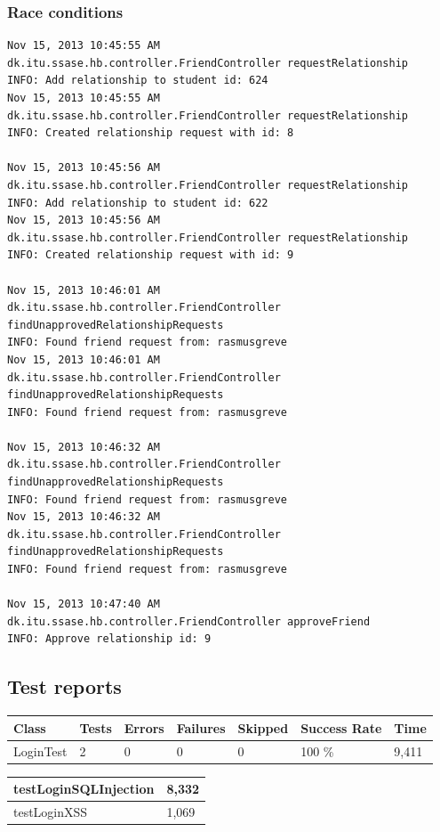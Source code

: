 \documentclass[a4paper]{article}
\begin{document}
\subsubsection{Race conditions \label{sec:appendix:racecondition}}
\begin{verbatim}
Nov 15, 2013 10:45:55 AM 
dk.itu.ssase.hb.controller.FriendController requestRelationship
INFO: Add relationship to student id: 624
Nov 15, 2013 10:45:55 AM 
dk.itu.ssase.hb.controller.FriendController requestRelationship
INFO: Created relationship request with id: 8

Nov 15, 2013 10:45:56 AM 
dk.itu.ssase.hb.controller.FriendController requestRelationship
INFO: Add relationship to student id: 622
Nov 15, 2013 10:45:56 AM 
dk.itu.ssase.hb.controller.FriendController requestRelationship
INFO: Created relationship request with id: 9

Nov 15, 2013 10:46:01 AM 
dk.itu.ssase.hb.controller.FriendController findUnapprovedRelationshipRequests
INFO: Found friend request from: rasmusgreve
Nov 15, 2013 10:46:01 AM 
dk.itu.ssase.hb.controller.FriendController findUnapprovedRelationshipRequests
INFO: Found friend request from: rasmusgreve

Nov 15, 2013 10:46:32 AM 
dk.itu.ssase.hb.controller.FriendController findUnapprovedRelationshipRequests
INFO: Found friend request from: rasmusgreve
Nov 15, 2013 10:46:32 AM 
dk.itu.ssase.hb.controller.FriendController findUnapprovedRelationshipRequests
INFO: Found friend request from: rasmusgreve

Nov 15, 2013 10:47:40 AM 
dk.itu.ssase.hb.controller.FriendController approveFriend
INFO: Approve relationship id: 9
\end{verbatim}

\subsection{Test reports}
\begin{table}[h!]
\begin{tabular}{| l | l | l | l | l | l | l |}
\hline
Class & Tests & Errors & Failures & Skipped & Success Rate & Time \\ \hline
LoginTest & 2 & 0 & 0 & 0 & 100 \% & 9,411 \\ \hline
\end{tabular}
\end{table}
\begin{table}[h!]
\begin{tabular}{| l | l |}
\hline
testLoginSQLInjection & 8,332 \\ \hline
testLoginXSS & 1,069 \\ \hline
\end{tabular}
\end{table}
\end{document}
